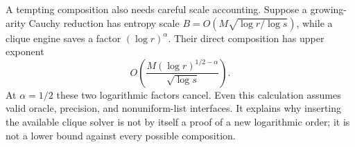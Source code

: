 A tempting composition also needs careful scale accounting. Suppose a
growing-arity Cauchy reduction has entropy scale
$B=O(M\sqrt{\log r/\log s})$, while a clique engine saves a factor
$(\log r)^\alpha$. Their direct composition has upper exponent
\[
 O\!\left(\frac{M(\log r)^{1/2-\alpha}}{\sqrt{\log s}}\right).
\]
At $\alpha=1/2$ these two logarithmic factors cancel. Even this calculation
assumes valid oracle, precision, and nonuniform-list interfaces. It explains
why inserting the available clique solver is not by itself a proof of a new
logarithmic order; it is not a lower bound against every possible composition.
